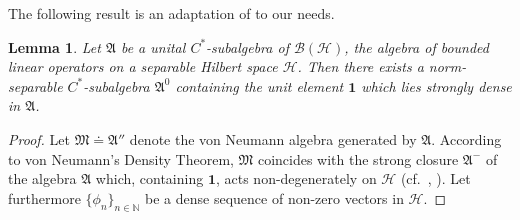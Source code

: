 \documentclass[a4paper,a4paper]{article}
\numberwithin{equation}{section}
\newcommand{\Nbb}{\mathbb{N}}
\newcommand{\Afrak}{\mathfrak{A}}
\newcommand{\Mfrak}{\mathfrak{M}}
\newcommand{\Hscr}{\mathscr{H}}
\newcommand{\unit}{\mathbf{1}}
\newcommand{\BH}{\mathscr{B} ( \mathscr{H} )}
\theoremstyle{definition}
\theoremstyle{plain}
\newtheorem{lemma}[definition]{Lemma}
\theoremstyle{remark}
\theoremstyle{assumption}
\newcommand{\bset}[1]{\bigl\{ #1 \bigr\}}
\begin{document}
  The following result is an adaptation of
  \cite[Lemma~14.1.17]{kadison/ringrose:1986} to our needs.
  \begin{lemma}
    Let $\Afrak$ be a unital $C^*$-subalgebra of $\BH$, the algebra of
    bounded linear operators on a separable Hilbert space $\Hscr$.
    Then there exists a norm-separable $C^*$-subalgebra $\Afrak^0$
    containing the unit element $\unit$ which lies strongly dense in
    $\Afrak$.
  \end{lemma}
  \begin{proof}
    Let $\Mfrak \doteq \Afrak''$ denote the von Neumann algebra
    generated by $\Afrak$. According to von Neumann's Density Theorem,
    $\Mfrak$ coincides with the strong closure $\Afrak^-$ of the
    algebra $\Afrak$ which, containing $\unit$, acts non-degenerately
    on $\Hscr$ (cf.~\cite[Section~I.3.4]{dixmier:1981},
    \cite[Corollary~2.4.15]{bratteli/robinson:1987}). Let furthermore
    $\bset{\phi_n}_{n \in \Nbb}$ be a dense sequence of non-zero
    vectors in $\Hscr$.
  

\end{proof}
\end{document}
